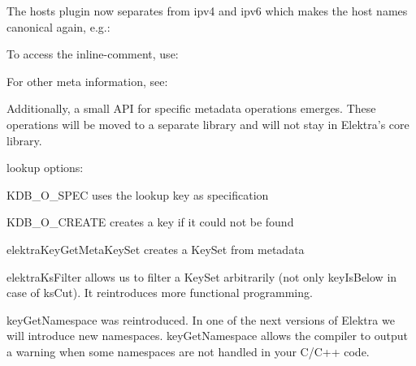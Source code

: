 \begin{DoxyCode}{0}
\end{DoxyCode}


The hosts plugin now separates from ipv4 and ipv6 which makes the host names canonical again, e.\+g.\+:


\begin{DoxyCode}{0}
\end{DoxyCode}


To access the inline-\/comment, use\+:


\begin{DoxyCode}{0}
\end{DoxyCode}


For other meta information, see\+:


\begin{DoxyCode}{0}
\end{DoxyCode}


Additionally, a small A\+PI for specific metadata operations emerges. These operations will be moved to a separate library and will not stay in Elektra’s core library.


\begin{DoxyItemize}
\item lookup options\+:
\begin{DoxyItemize}
\item {\ttfamily K\+D\+B\+\_\+\+O\+\_\+\+S\+P\+EC} uses the lookup key as specification
\item {\ttfamily K\+D\+B\+\_\+\+O\+\_\+\+C\+R\+E\+A\+TE} creates a key if it could not be found
\end{DoxyItemize}
\item {\ttfamily elektra\+Key\+Get\+Meta\+Key\+Set} creates a Key\+Set from metadata
\item {\ttfamily elektra\+Ks\+Filter} allows us to filter a Key\+Set arbitrarily (not only {\ttfamily key\+Is\+Below} in case of {\ttfamily ks\+Cut}). It reintroduces more functional programming.
\item {\ttfamily key\+Get\+Namespace} was reintroduced. In one of the next versions of Elektra we will introduce new namespaces. {\ttfamily key\+Get\+Namespace} allows the compiler to output a warning when some namespaces are not handled in your C/\+C++ code.
\end{DoxyItemize}

